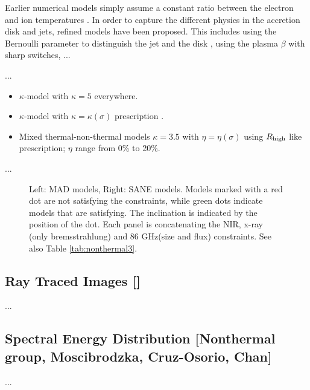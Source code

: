 \documentclass[twocolumn,tighten,dvipsnames,linenumbers]{aastex63}
\begin{document}
Earlier numerical models simply assume a constant ratio between the
electron and ion temperatures \citep{...}.
In order to capture the different physics in the accretion disk and
jets, refined models have been proposed.
This includes using the Bernoulli parameter to distinguish the jet and
the disk \citep{2014A&A...570A...7M}, using the plasma $\beta$
\citep{2015ApJ...799....1C, 2015ApJ...812..103C} with sharp switches, ...

...

\begin{itemize}
\item $\kappa$-model with $\kappa = 5$ everywhere.
\item $\kappa$-model with $\kappa = \kappa(\sigma)$ prescription
  \citep{2016ApJ...826...77B}.
\item Mixed thermal-non-thermal models $\kappa = 3.5$ with $\eta =
  \eta(\sigma)$ using ${R_\mathrm{high}}$ like prescription; $\eta$ range from 0\%
  to 20\%.
\end{itemize}

...

\begin{figure}    
  \caption{Left: MAD models, Right: SANE models.  Models marked with a red dot are not satisfying the constraints, while green dots indicate models that are satisfying.  The inclination is indicated by the position of the dot. Each panel is concatenating  the NIR, x-ray (only bremsstrahlung) and 86 GHz(size and flux) constraints. See also Table \ref{tab:nonthermal3}. }
  \label{fig:nonthermal3}
\end{figure}

\subsection{Ray Traced Images
  []}
\label{sec:images}

...

\subsection{Spectral Energy Distribution
  [Nonthermal group, Moscibrodzka, Cruz-Osorio, Chan]}
\label{sec:SED}

...

\end{document}
